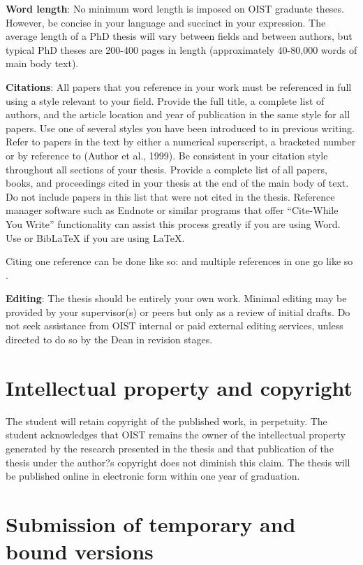 \textbf{Word length}:  No minimum word length is imposed on OIST graduate theses.  However, be concise in your language and succinct in your expression.  The average length of a PhD thesis will vary between fields and between authors, but typical PhD theses are 200-400 pages in length (approximately 40-80,000 words of main body text).  

\textbf{Citations}:  All papers that you reference in your work must be referenced in full using a style relevant to your field. Provide the full title, a complete list of authors, and the article location and year of publication in the same style for all papers. Use one of several styles you have been introduced to in previous writing.  Refer to papers in the text by either a numerical superscript, a bracketed number or by reference to (Author et al., 1999).  Be consistent in your citation style throughout all sections of your thesis.  Provide a complete list of all papers, books, and proceedings cited in your thesis at the end of the main body of text.  Do not include papers in this list that were not cited in the thesis.  Reference manager software such as Endnote or similar programs that offer ``Cite-While You Write'' functionality can assist this process greatly if you are using Word. Use  or BibLaTeX if you are using LaTeX.

Citing one reference can be done like so: \cite{Lee98} and multiple references in one go like so \cite{Fil09, Muc10, Kra27}.

\textbf{Editing}:  The thesis should be entirely your own work. Minimal editing may be provided by your supervisor(s) or peers but only as a review of initial drafts.  Do not seek assistance from OIST internal or paid external editing services, unless directed to do so by the Dean in revision stages.

\section{Intellectual property and copyright}

The student will retain copyright of the published work, in perpetuity.  The student acknowledges that OIST remains the owner of the intellectual property generated by the research presented in the thesis and that publication of the thesis under the author?s copyright does not diminish this claim.  The thesis will be published online in electronic form within one year of graduation.


 \section{Submission of temporary and bound versions}

